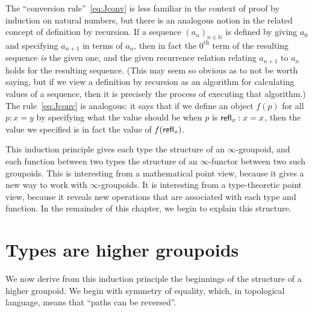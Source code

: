 The ``conversion rule''~\eqref{eq:Jconv} is less familiar in the context of proof by induction on natural numbers, but there is an analogous notion in the related concept of definition by recursion.
If a sequence $(a_n)_{n\in \mathbb{N}}$ is defined by giving $a_0$ and specifying $a_{n+1}$ in terms of $a_n$, then in fact the $0^{\mathrm{th}}$ term of the resulting sequence \emph{is} the given one, and the given recurrence relation relating $a_{n+1}$ to $a_n$ holds for the resulting sequence.
(This may seem so obvious as to not be worth saying, but if we view a definition by recursion as an algorithm for calculating values of a sequence, then it is precisely the process of executing that algorithm.)
The rule~\eqref{eq:Jconv} is analogous: it says that if we define an object $f(p)$ for all $p:x=y$ by specifying what the value should be when $p$ is $\mathsf{refl}_{x}:x=x$, then the value we specified is in fact the value of $f(\mathsf{refl}_{x})$.

This induction principle gives each type the structure of an $\infty$-groupoid, and each function between two types the structure of an $\infty$-functor between two such groupoids.  This is interesting from a mathematical point view, because it gives a new way to work with
$\infty$-groupoids.  It is interesting from a type-theoretic point view, because it reveals new operations that are associated with each type and function.  In the remainder of this chapter, we begin to explain this structure.

\section{Types are higher groupoids}
\label{sec:equality}

%
We now derive from this induction principle the beginnings of the structure of a higher groupoid.
We begin with symmetry of equality, which, in topological language, means that ``paths can be reversed''.

